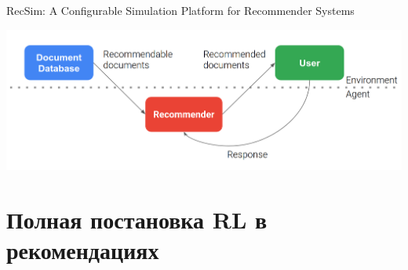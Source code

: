 \documentclass[11pt,aspectratio=169,handout]{beamer}
\begin{document}
\begin{frame}{RecSim: A Configurable Simulation Platform for Recommender Systems \cite{RECSIM}}

\begin{center}
\includegraphics[scale=0.2]{images/recsim.png}
\end{center}

\end{frame}

\section{Полная постановка RL в рекомендациях}
\end{document}
